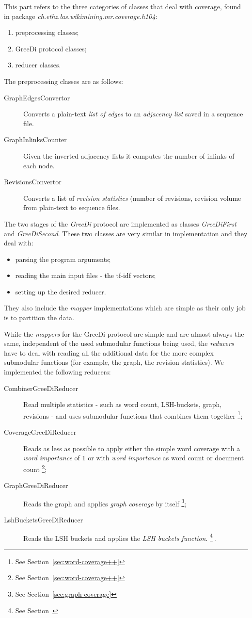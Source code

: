 This part refers to the three categories of classes that deal with coverage,
found in package \emph{ch.ethz.las.wikimining.mr.coverage.h104}:
\begin{enumerate}
  \item preprocessing classes;
  \item GreeDi protocol classes;
  \item reducer classes.
\end{enumerate}

The preprocessing classes are as follows:
\begin{description}
  \item[GraphEdgesConvertor] Converts a plain-text \emph{list of edges} to an
  \emph{adjacency list} saved in a sequence file.
  \item[GraphInlinksCounter] Given the inverted adjacency lists it computes the
  number of inlinks of each node.
  \item[RevisionsConvertor] Converts a list of \emph{revision statistics}
  (number of revisions, revision volume from plain-text to sequence files.
\end{description}

The two stages of the \emph{GreeDi} protocol are implemented as classes
\emph{GreeDiFirst} and \emph{GreeDiSecond}. These two classes are very similar
in implementation and they deal with:
\begin{itemize}
  \item parsing the program arguments;
  \item reading the main input files - the tf-idf vectors;
  \item setting up the desired reducer.
\end{itemize}
They also include the \emph{mapper} implementations which are simple as their
only job is to partition the data.

While the \emph{mappers} for the GreeDi protocol are simple and are almost
always the same, independent of the used submodular functions being used, the
\emph{reducers} have to deal with reading all the additional data for the more
complex submodular functions (for example, the graph, the revision statistics).
We implemented the following reducers:
\begin{description}
  \item[CombinerGreeDiReducer] Read multiple statistics - such as word count,
  LSH-buckets, graph, revisions - and uses submodular functions that combines
  them together \footnote{See Section~\vref{sec:word-coverage++}};
  \item[CoverageGreeDiReducer] Reads as less as possible to apply either the
  simple word coverage with a \emph{word importance} of \(1\) or with
  \emph{word importance} as word count or document count \footnote{See
  Section~\vref{sec:word-coverage++}};
  \item[GraphGreeDiReducer] Reads the graph and applies \emph{graph coverage}
  by itself \footnote{See Section~\vref{sec:graph-coverage}};
  \item[LshBucketsGreeDiReducer] Reads the \ac{LSH} buckets and applies the
  \emph{\ac{LSH} buckets function}. \footnote{See Section~ } .
\end{description}

